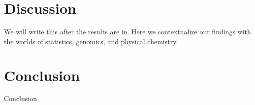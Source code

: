 \section{Discussion}
We will write this after the results are in. Here we contextualize our findings with the worlds of statistics, genomics, and physical chemistry.





\section{Conclusion}
Conclusion

